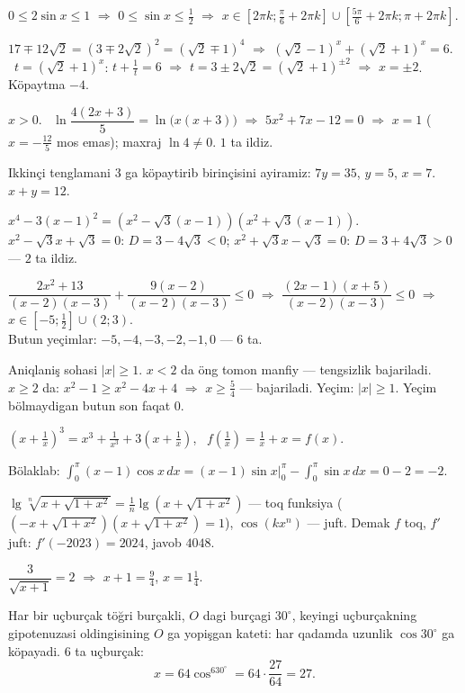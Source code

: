 $0\le2\sin x\le1$ $\Rightarrow$ $0\le\sin x\le\frac12$ $\Rightarrow$ $x\in\left[2\pi k;\frac\pi6+2\pi k\right]\cup\left[\frac{5\pi}6+2\pi k;\pi+2\pi k\right]$.

$17\mp12\sqrt2=(3\mp2\sqrt2)^2=(\sqrt2\mp1)^4$ $\Rightarrow$ $(\sqrt2-1)^x+(\sqrt2+1)^x=6$. \ $t=(\sqrt2+1)^x$: $t+\frac1t=6$ $\Rightarrow$ $t=3\pm2\sqrt2=(\sqrt2+1)^{\pm2}$ $\Rightarrow$ $x=\pm2$. Köpaytma $-4$.

$x>0$. \ $\ln\dfrac{4(2x+3)}5=\ln\bigl(x(x+3)\bigr)$ $\Rightarrow$ $5x^2+7x-12=0$ $\Rightarrow$ $x=1$ ($x=-\frac{12}5$ mos emas); maxraj $\ln4\ne0$. $1$ ta ildiz.

Ikkinçi tenglamani $3$ ga köpaytirib birinçisini ayiramiz: $7y=35$, $y=5$, $x=7$. \ $x+y=12$.

$x^4-3(x-1)^2=\left(x^2-\sqrt3(x-1)\right)\left(x^2+\sqrt3(x-1)\right)$.\\
$x^2-\sqrt3x+\sqrt3=0$: $D=3-4\sqrt3<0$; \quad $x^2+\sqrt3x-\sqrt3=0$: $D=3+4\sqrt3>0$ — $2$ ta ildiz.

$\dfrac{2x^2+13}{(x-2)(x-3)}+\dfrac{9(x-2)}{(x-2)(x-3)}\le0$ $\Rightarrow$ $\dfrac{(2x-1)(x+5)}{(x-2)(x-3)}\le0$ $\Rightarrow$ $x\in\left[-5;\frac12\right]\cup(2;3)$.\\
Butun yeçimlar: $-5,-4,-3,-2,-1,0$ — $6$ ta.

Aniqlaniş sohasi $|x|\ge1$. $x<2$ da öng tomon manfiy — tengsizlik bajariladi. $x\ge2$ da: $x^2-1\ge x^2-4x+4$ $\Rightarrow$ $x\ge\frac54$ — bajariladi. Yeçim: $|x|\ge1$. Yeçim bölmaydigan butun son faqat $0$.

$\left(x+\frac1x\right)^3=x^3+\frac1{x^3}+3\left(x+\frac1x\right)$, \ $f\left(\frac1x\right)=\frac1x+x=f(x)$.

Bölaklab: $\displaystyle\int_0^\pi(x-1)\cos x\,dx=(x-1)\sin x\Big|_0^\pi-\int_0^\pi\sin x\,dx=0-2=-2$.

$\lg\sqrt[n]{x+\sqrt{1+x^2}}=\frac1n\lg\left(x+\sqrt{1+x^2}\right)$ — toq funksiya ($(-x+\sqrt{1+x^2})(x+\sqrt{1+x^2})=1$), $\cos(kx^n)$ — juft. Demak $f$ toq, $f'$ juft: $f'(-2023)=2024$, javob $4048$.

$\dfrac3{\sqrt{x+1}}=2$ $\Rightarrow$ $x+1=\frac94$, $x=1\frac14$.

Har bir uçburçak töğri burçakli, $O$ dagi burçagi $30^\circ$, keyingi uçburçakning gipotenuzasi oldingisining $O$ ga yopişgan kateti: har qadamda uzunlik $\cos30^\circ$ ga köpayadi. $6$ ta uçburçak:
\[x=64\cos^630^\circ=64\cdot\frac{27}{64}=27.\]


